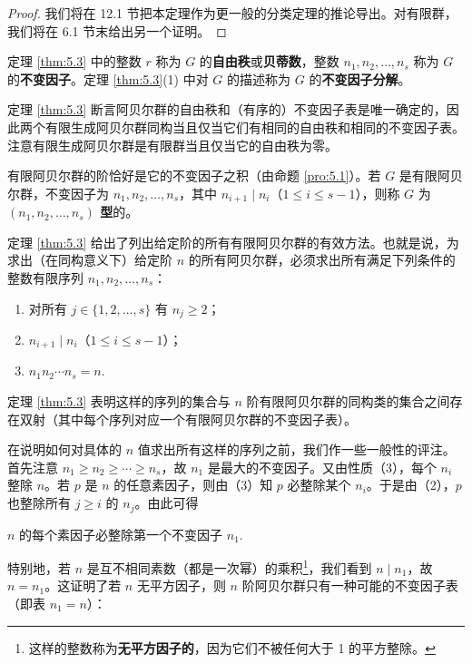 \begin{proof}
我们将在 12.1 节把本定理作为更一般的分类定理的推论导出。对有限群，我们将在 6.1 节末给出另一个证明。
\end{proof}

\begin{definition}
定理 \ref{thm:5.3} 中的整数 \(r\) 称为 \(G\) 的\textbf{自由秩}或\textbf{贝蒂数}，整数 \(n_1, n_2, \ldots, n_s\) 称为 \(G\) 的\textbf{不变因子}。定理 \ref{thm:5.3}(1) 中对 \(G\) 的描述称为 \(G\) 的\textbf{不变因子分解}。
\end{definition}

定理 \ref{thm:5.3} 断言阿贝尔群的自由秩和（有序的）不变因子表是唯一确定的，因此两个有限生成阿贝尔群同构当且仅当它们有相同的自由秩和相同的不变因子表。注意有限生成阿贝尔群是有限群当且仅当它的自由秩为零。

有限阿贝尔群的阶恰好是它的不变因子之积（由命题 \ref{pro:5.1}）。若 \(G\) 是有限阿贝尔群，不变因子为 \(n_1, n_2, \ldots, n_s\)，其中 \(n_{i+1} \mid n_i\)（\(1 \leq i \leq s-1\)），则称 \(G\) 为 \textbf{\((n_1, n_2, \ldots, n_s)\) 型}的。

定理 \ref{thm:5.3} 给出了列出给定阶的所有有限阿贝尔群的有效方法。也就是说，为求出（在同构意义下）给定阶 \(n\) 的所有阿贝尔群，必须求出所有满足下列条件的整数有限序列 \(n_1, n_2, \ldots, n_s\)：

\begin{enumerate}[label=(\arabic*)]
\item 对所有 \(j \in \{1, 2, \ldots, s\}\) 有 \(n_j \geq 2\)；
\item \(n_{i+1} \mid n_i\)（\(1 \leq i \leq s-1\)）；
\item \(n_1n_2\cdots n_s = n\).
\end{enumerate}

定理 \ref{thm:5.3} 表明这样的序列的集合与 \(n\) 阶有限阿贝尔群的同构类的集合之间存在双射（其中每个序列对应一个有限阿贝尔群的不变因子表）。

在说明如何对具体的 \(n\) 值求出所有这样的序列之前，我们作一些一般性的评注。首先注意 \(n_1 \geq n_2 \geq \cdots \geq n_s\)，故 \(n_1\) 是最大的不变因子。又由性质（3），每个 \(n_i\) 整除 \(n\)。若 \(p\) 是 \(n\) 的任意素因子，则由（3）知 \(p\) 必整除某个 \(n_i\)。于是由（2），\(p\) 也整除所有 \(j \geq i\) 的 \(n_j\)。由此可得
\begin{center}
\(n\) 的每个素因子必整除第一个不变因子 \(n_1\).
\end{center}
特别地，若 \(n\) 是互不相同素数（都是一次幂）的乘积\footnote{这样的整数称为\textbf{无平方因子的}，因为它们不被任何大于 1 的平方整除。}，我们看到 \(n \mid n_1\)，故 \(n = n_1\)。这证明了若 \(n\) 无平方因子，则 \(n\) 阶阿贝尔群只有一种可能的不变因子表（即表 \(n_1 = n\)）：

